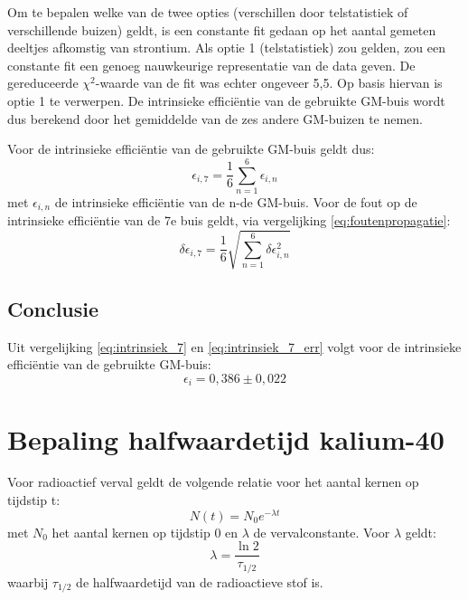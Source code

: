 \documentclass[11pt,a4paper]{article}
\begin{document}
Om te bepalen welke van de twee opties (verschillen door telstatistiek of verschillende buizen) geldt, is een constante fit gedaan op het aantal gemeten deeltjes afkomstig van strontium. Als optie 1 (telstatistiek) zou gelden, zou een constante fit een genoeg nauwkeurige representatie van de data geven. De gereduceerde $\chi^2$-waarde van de fit was echter ongeveer 5,5. Op basis hiervan is optie 1 te verwerpen. De intrinsieke efficiëntie van de gebruikte GM-buis wordt dus berekend door het gemiddelde van de zes andere GM-buizen te nemen.

Voor de intrinsieke efficiëntie van de gebruikte GM-buis geldt dus:
\begin{equation}
\epsilon_{i,7} = \frac{1}{6}\sum_{n=1}^{6}\epsilon_{i,n}
\label{eq:intrinsiek_7}
\end{equation}
met $\epsilon_{i,n}$ de intrinsieke efficiëntie van de n-de GM-buis. Voor de fout op de intrinsieke efficiëntie van de 7e buis geldt, via vergelijking \ref{eq:foutenpropagatie}:
\begin{equation}
\delta \epsilon_{i,7} = \frac{1}{6}\sqrt{\sum_{n=1}^{6}\delta\epsilon_{i,n}^2}
\label{eq:intrinsiek_7_err}
\end{equation}

\subsection{Conclusie}
Uit vergelijking \ref{eq:intrinsiek_7} en \ref{eq:intrinsiek_7_err} volgt voor de intrinsieke efficiëntie van de gebruikte GM-buis:
\begin{equation}
\epsilon_i = 0,386 \pm 0,022
\label{eq:intrinsiek_7_waarde}
\end{equation}

\section{Bepaling halfwaardetijd kalium-40}
Voor radioactief verval geldt de volgende relatie voor het aantal kernen op tijdstip t:
\begin{equation}
N(t) = N_0 e^{-\lambda t}
\label{eq:verval}
\end{equation}
met $N_0$ het aantal kernen op tijdstip 0 en $\lambda$ de vervalconstante. Voor $\lambda$ geldt:
\begin{equation}
\lambda = \frac{\ln 2}{\tau_{1/2}}
\label{eq:vervalconstante}
\end{equation}
waarbij $\tau_{1/2}$ de halfwaardetijd van de radioactieve stof is.
\end{document}
